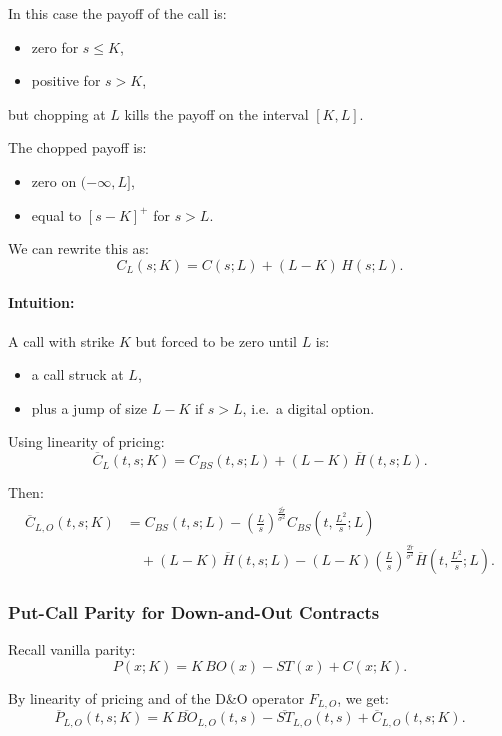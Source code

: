 \documentclass[12pt,a4paper]{article}
\theoremstyle{definition}
\begin{document}
In this case the payoff of the call is:
\begin{itemize}
\item zero for $s \leq K$,
\item positive for $s > K$,
\end{itemize}
but chopping at $L$ kills the payoff on the interval $[K, L]$.

The chopped payoff is:
\begin{itemize}
  \item zero on $(-\infty, L]$,
  \item equal to $[s - K]^+$ for $s > L$.
\end{itemize}

We can rewrite this as:
\[
C_L(s; K) = C(s; L) + (L - K)\, H(s; L).
\]

\paragraph{Intuition:}

A call with strike $K$ but forced to be zero until $L$ is:
\begin{itemize}
\item a call struck at $L$,
\item plus a jump of size $L - K$ if $s > L$, i.e.\ a digital option.
\end{itemize}

Using linearity of pricing:
\[
\overline{C}_L(t, s; K) = C_{BS}(t, s; L) + (L - K)\, \overline{H}(t, s; L).
\]

Then:
\[
\begin{aligned}
\overline{C}_{L,O}(t, s; K) &= C_{BS}(t, s; L) - \left(\frac{L}{s}\right)^{\frac{2\widetilde{r}}{\sigma^2}} C_{BS}\!\left(t, \frac{L^2}{s}; L\right) \\
&\quad + (L - K)\, \overline{H}(t, s; L) - (L - K)\left(\frac{L}{s}\right)^{\frac{2\widetilde{r}}{\sigma^2}} \overline{H}\!\left(t, \frac{L^2}{s}; L\right).
\end{aligned}
\]

\subsubsection{Put-Call Parity for Down-and-Out Contracts}

Recall vanilla parity:
\[
P(x; K) = K\, BO(x) - ST(x) + C(x; K).
\]

By linearity of pricing and of the D\&O operator $F_{L,O}$, we get:
\[
\overline{P}_{L,O}(t, s; K) = K\, \overline{BO}_{L,O}(t, s) - \overline{ST}_{L,O}(t, s) + \overline{C}_{L,O}(t, s; K).
\]
\end{document}
